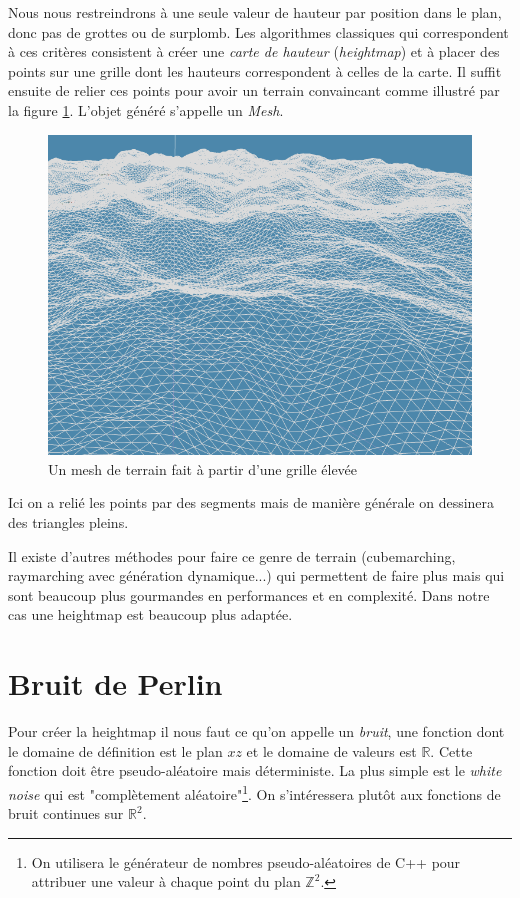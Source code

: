 \documentclass{EPUProjetDi}
\begin{document}
Nous nous restreindrons à une seule valeur de hauteur par position dans le plan, donc pas de grottes ou de surplomb. Les algorithmes classiques qui correspondent à ces critères consistent à créer une \textit{carte de hauteur} (\textit{heightmap}) et à placer des points sur une grille dont les hauteurs correspondent à celles de la carte. Il suffit ensuite de relier ces points pour avoir un terrain convaincant comme illustré par la figure \ref{fig:wireframe_terrain}. L'objet généré s'appelle un \textit{Mesh}.

\begin{figure}[ht]
	\centering
	\includegraphics[scale=.49]{terrain_wireframe}
	\caption{Un mesh de terrain fait à partir d'une grille élevée}
	\label{fig:wireframe_terrain}
\end{figure}

Ici on a relié les points par des segments mais de manière générale on dessinera des triangles pleins.

Il existe d'autres méthodes pour faire ce genre de terrain (cubemarching, raymarching avec génération dynamique...) qui permettent de faire plus mais qui sont beaucoup plus gourmandes en performances et en complexité. Dans notre cas une heightmap est beaucoup plus adaptée.

\section{Bruit de Perlin}

Pour créer la heightmap il nous faut ce qu'on appelle un \textit{bruit}, une fonction dont le domaine de définition est le plan $xz$ et le domaine de valeurs est $\mathbb{R}$. Cette fonction doit être pseudo-aléatoire mais déterministe. La plus simple est le \textit{white noise} qui est "complètement aléatoire"\footnote{On utilisera le générateur de nombres pseudo-aléatoires de C++ pour attribuer une valeur à chaque point du plan $\mathbb{Z}^2$.}. On s'intéressera plutôt aux fonctions de bruit continues sur $\mathbb{R}^2$.
\end{document}
